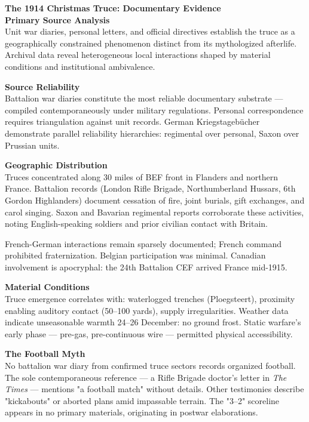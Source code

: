 \begin{technical}
{\Large\textbf{The 1914 Christmas Truce: Documentary Evidence}}\\[0.7em]

\noindent\textbf{Primary Source Analysis}\\[0.5em]
Unit war diaries, personal letters, and official directives establish the truce as a geographically constrained phenomenon distinct from its mythologized afterlife. Archival data reveal heterogeneous local interactions shaped by material conditions and institutional ambivalence.

\noindent\textbf{Source Reliability}\\[0.5em]
Battalion war diaries constitute the most reliable documentary substrate — compiled contemporaneously under military regulations. Personal correspondence requires triangulation against unit records. German Kriegstagebücher demonstrate parallel reliability hierarchies: regimental over personal, Saxon over Prussian units.

\noindent\textbf{Geographic Distribution}\\[0.5em]
Truces concentrated along 30 miles of BEF front in Flanders and northern France. Battalion records (London Rifle Brigade, Northumberland Hussars, 6th Gordon Highlanders) document cessation of fire, joint burials, gift exchanges, and carol singing. Saxon and Bavarian regimental reports corroborate these activities, noting English-speaking soldiers and prior civilian contact with Britain.

French-German interactions remain sparsely documented; French command prohibited fraternization. Belgian participation was minimal. Canadian involvement is apocryphal: the 24th Battalion CEF arrived France mid-1915.

\noindent\textbf{Material Conditions}\\[0.5em]
Truce emergence correlates with: waterlogged trenches (Ploegsteert), proximity enabling auditory contact (50–100 yards), supply irregularities. Weather data indicate unseasonable warmth 24–26 December: no ground frost. Static warfare's early phase — pre-gas, pre-continuous wire — permitted physical accessibility.

\noindent\textbf{The Football Myth}\\[0.5em]
No battalion war diary from confirmed truce sectors records organized football. The sole contemporaneous reference — a Rifle Brigade doctor's letter in \textit{The Times} — mentions "a football match" without details. Other testimonies describe "kickabouts" or aborted plans amid impassable terrain. The "3–2" scoreline appears in no primary materials, originating in postwar elaborations. 


\end{technical}
